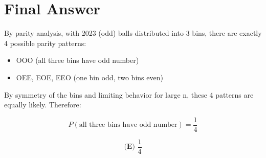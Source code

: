 \documentclass[12pt]{article}
\begin{document}
\section*{Final Answer}

By parity analysis, with 2023 (odd) balls distributed into 3 bins, there are exactly 4 possible parity patterns:
\begin{itemize}
    \item OOO (all three bins have odd number)
    \item OEE, EOE, EEO (one bin odd, two bins even)
\end{itemize}

By symmetry of the bins and limiting behavior for large n, these 4 patterns are equally likely. Therefore:

$$P(\text{all three bins have odd number}) = \frac{1}{4}$$

$$\boxed{\textbf{(E) } \frac{1}{4}}$$
\end{document}
